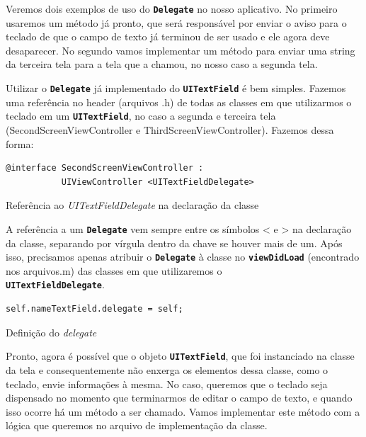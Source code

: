 \documentclass[a4paper,12pt,brazil,oneside]{book}
\begin{document}
Veremos dois exemplos de uso do \texttt{\textbf{Delegate}} no nosso aplicativo. No primeiro usaremos um método já pronto, que será responsável por enviar o aviso para o teclado de que o campo de texto já terminou de ser usado e ele agora deve desaparecer. No segundo vamos implementar um método para enviar uma string da terceira tela para a tela que a chamou, no nosso caso a segunda tela.

Utilizar o \texttt{\textbf{Delegate}} já implementado do \texttt{\textbf{UITextField}} é bem simples. Fazemos uma referência no header (arquivos .h) de todas as classes em que utilizarmos o teclado em um \texttt{\textbf{UITextField}}, no caso a segunda e terceira tela (SecondScreenViewController e ThirdScreenViewController). Fazemos dessa forma:

\begin{listing}[H]
\begin{verbatim}
@interface SecondScreenViewController :
           UIViewController <UITextFieldDelegate>
\end{verbatim}
\caption{Referência ao \emph{UITextFieldDelegate} na declaração da classe}
\end{listing}


A referência a um \texttt{\textbf{Delegate}} vem sempre entre os símbolos < e > na declaração da classe, separando por vírgula dentro da chave se houver mais de um. Após isso, precisamos apenas atribuir o \texttt{\textbf{Delegate}} à classe no \texttt{\textbf{viewDidLoad}} (encontrado nos arquivos.m) das classes em que utilizaremos o\\ \texttt{\textbf{UITextFieldDelegate}}.

\begin{listing}[H]
\begin{verbatim}
self.nameTextField.delegate = self;
\end{verbatim}
\caption{Definição do \emph{delegate}}
\end{listing}

Pronto, agora é possível que o objeto \texttt{\textbf{UITextField}}, que foi instanciado na classe da tela e consequentemente não enxerga os elementos dessa classe, como o teclado, envie informações à mesma. No caso, queremos que o teclado seja dispensado no momento que terminarmos de editar o campo de texto, e quando isso ocorre há um método a ser chamado. Vamos implementar este método com a lógica que queremos no arquivo de implementação da classe.
\end{document}
